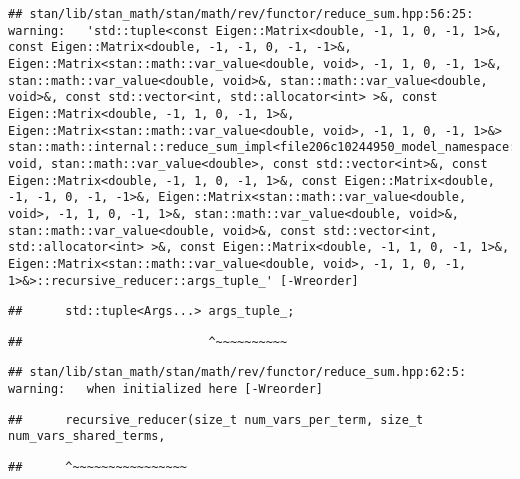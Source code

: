 \documentclass[
]{article}
\begin{document}
\begin{verbatim}
## stan/lib/stan_math/stan/math/rev/functor/reduce_sum.hpp:56:25: warning:   'std::tuple<const Eigen::Matrix<double, -1, 1, 0, -1, 1>&, const Eigen::Matrix<double, -1, -1, 0, -1, -1>&, Eigen::Matrix<stan::math::var_value<double, void>, -1, 1, 0, -1, 1>&, stan::math::var_value<double, void>&, stan::math::var_value<double, void>&, const std::vector<int, std::allocator<int> >&, const Eigen::Matrix<double, -1, 1, 0, -1, 1>&, Eigen::Matrix<stan::math::var_value<double, void>, -1, 1, 0, -1, 1>&> stan::math::internal::reduce_sum_impl<file206c10244950_model_namespace::partial_log_lik_rsfunctor__, void, stan::math::var_value<double>, const std::vector<int>&, const Eigen::Matrix<double, -1, 1, 0, -1, 1>&, const Eigen::Matrix<double, -1, -1, 0, -1, -1>&, Eigen::Matrix<stan::math::var_value<double, void>, -1, 1, 0, -1, 1>&, stan::math::var_value<double, void>&, stan::math::var_value<double, void>&, const std::vector<int, std::allocator<int> >&, const Eigen::Matrix<double, -1, 1, 0, -1, 1>&, Eigen::Matrix<stan::math::var_value<double, void>, -1, 1, 0, -1, 1>&>::recursive_reducer::args_tuple_' [-Wreorder]
\end{verbatim}

\begin{verbatim}
##      std::tuple<Args...> args_tuple_;
\end{verbatim}

\begin{verbatim}
##                          ^~~~~~~~~~~
\end{verbatim}

\begin{verbatim}
## stan/lib/stan_math/stan/math/rev/functor/reduce_sum.hpp:62:5: warning:   when initialized here [-Wreorder]
\end{verbatim}

\begin{verbatim}
##      recursive_reducer(size_t num_vars_per_term, size_t num_vars_shared_terms,
\end{verbatim}

\begin{verbatim}
##      ^~~~~~~~~~~~~~~~~
\end{verbatim}
\end{document}
